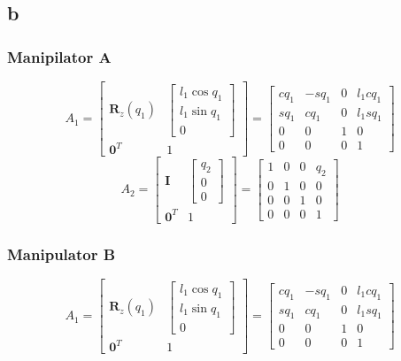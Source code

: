 \documentclass[11pt]{article}
\begin{document}
\subsection*{b}
\subsubsection*{Manipilator A}
\[A_1 = 
\begin{bmatrix}
\mathbf{R}_z(q_1) & \begin{bmatrix} l_1 \cos{q_1} \\ l_1 \sin{q_1} \\ 0 \end{bmatrix} \\
\mathbf{0}^T & 1
\end{bmatrix}
=
\begin{bmatrix}
c q_1 & - s q_1 & 0 & l_1 c q_1 \\
s q_1 & c q_1 & 0 & l_1 s q_1 \\
0 & 0 & 1 & 0 \\
0 & 0 & 0 & 1
\end{bmatrix}
\]
\[A_2 =
\begin{bmatrix}
\mathbf{I} & \begin{bmatrix} q_2 \\ 0 \\ 0 \end{bmatrix} \\
\mathbf{0}^T & 1
\end{bmatrix}
=
\begin{bmatrix}
1 & 0 & 0 & q_2 \\
0 & 1 & 0 & 0 \\
0 & 0 & 1 & 0 \\
0 & 0 & 0 & 1
\end{bmatrix}
\]

\subsubsection*{Manipulator B}
\[A_1 = 
\begin{bmatrix}
\mathbf{R}_z(q_1) & \begin{bmatrix} l_1 \cos{q_1} \\ l_1 \sin{q_1} \\ 0 \end{bmatrix} \\
\mathbf{0}^T & 1
\end{bmatrix}
=
\begin{bmatrix}
c q_1 & - s q_1 & 0 & l_1 c q_1 \\
s q_1 & c q_1 & 0 & l_1 s q_1 \\
0 & 0 & 1 & 0 \\
0 & 0 & 0 & 1
\end{bmatrix}
\]
\end{document}
